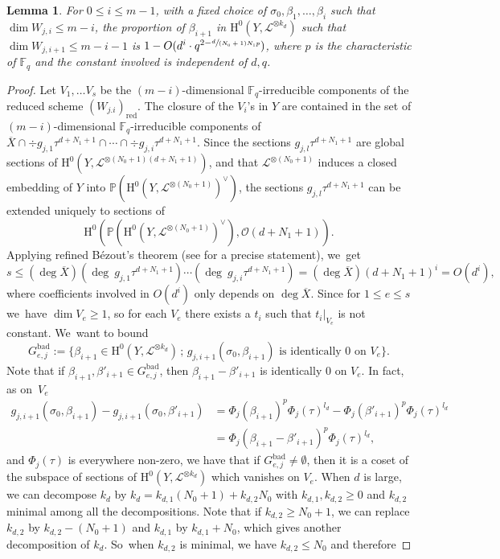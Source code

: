 \documentclass[JEP,XML,SOM,Unicode,published]{cedram}
\newcommand{\sep}{\,;\,}
\theoremstyle{plain}
\newtheorem{lem}[thm]{Lemma}
\theoremstyle{definition}
\newcommand{\ho}{\mathrm{H}}
\newcommand{\li}{\mathcal{L}}
\newcommand{\pr}{\mathbb{P}}
\newcommand{\F}{\mathbb{F}}
\begin{document}
\begin{lem}\label{reddim}
For $0\leq i\leq m-1$, with a fixed choice of $\sigma_0,\beta_1,\dots, \beta_i$ such that $\dim W_{j,i}\leq m-i$, the proportion of $\beta_{i+1}$ in $\ho^0(Y,\mathcal{L}^{\otimes k_d})$ such that $\dim W_{j,i+1} \leq m-i-1$ is $1-O(d^i\cdot q^{2-\sfrac{d}{(N_0+1)N_1p}})$, where $p$ is the characteristic of $\F_q$ and the constant involved is independent of $d,q$.
\end{lem}
\begin{proof}[Proof]
Let $V_1,\dots V_s$ be the $(m-i)$-dimensional $\F_q$-irreducible components of the reduced scheme $(W_{j.i})_{\mathrm{red}}$. The closure of the $V_i$'s in $Y$ are contained in the set of $(m-i)$-dimensional $\F_q$-irreducible components of $\overline{X}\cap \div g_{j,1}\tau^{d+N_1+1}\cap \cdots \cap \div g_{j,i}\tau^{d+N_1+1}$. Since the sections $g_{j,l}\tau^{d+N_1+1}$ are global sections of $\ho^0(Y, \li^{\otimes (N_0+1)(d+N_1+1)})$, and that $\li^{\otimes (N_0+1)}$ induces a closed embedding of $Y$ into $\pr(\ho^0(Y, \li^{\otimes (N_0+1)})^{\vee})$, the sections $g_{j,l}\tau^{d+N_1+1}$ can be extended uniquely to sections of
\[
\ho^0(\pr(\ho^0(Y, \li^{\otimes (N_0+1)})^{\vee}), \mathcal{O}(d+N_1+1)).
\]
Applying refined Bézout's theorem (see \cite[Th.\,12.3]{Fu84} for a precise statement), we~get
\[
s\leq (\deg \overline{X})(\deg \ g_{j,1}\tau^{d+N_1+1})\cdots (\deg \ g_{j,i}\tau^{d+N_1+1})=(\deg \overline{X})(d+N_1+1)^i=O(d^i),
\]
where coefficients involved in $O(d^i)$ only depends on $\deg \overline{X}$.
Since for $1\leq e\leq s$ we~have $\dim V_e\geq 1$, so for each $V_e$ there exists a $t_i$ such that $t_i|_{V_e}$ is not constant. We~want to bound
\[
G_{e,j}^{\mathrm{bad}}:=\bigl\{ \beta_{i+1}\in \ho^0(Y, \li^{\otimes k_d}) \sep g_{j, i+1}(\sigma_0, \beta_{i+1}) \text{ is identically }0 \text{ on }V_e \bigr\}.
\]
Note that if $\beta_{i+1},\beta'_{i+1}\!\in\! G_{e,j}^{\mathrm{bad}}$, then $\beta_{i+1}-\beta'_{i+1}$ is identically $0$ on $V_e$. In fact, as on~$V_e$
\begin{align*}
g_{j,i+1}(\sigma_0, \beta_{i+1})-g_{j,i+1}(\sigma_0, \beta'_{i+1})&= \Phi_j(\beta_{i+1})^p\Phi_j(\tau)^{l_d}-\Phi_j(\beta'_{i+1})^p\Phi_j(\tau)^{l_d} \\
&= \Phi_j(\beta_{i+1}-\beta'_{i+1})^p\Phi_j(\tau)^{l_d},
\end{align*}
and $\Phi_j(\tau)$ is everywhere non-zero, we have that if $G_{e,j}^{\mathrm{bad}}\not=\emptyset$, then it is a coset of the subspace of sections of $\ho^0(Y, \li^{\otimes k_d})$ which vanishes on $V_e$. When $d$ is large, we can decompose $k_d$ by $k_d=k_{d,1}(N_0+1)+k_{d,2}N_0$ with $k_{d,1},k_{d,2}\geq 0$ and $k_{d,2}$ minimal among all the decompositions. Note that if $k_{d,2}\geq N_0+1$, we can replace $k_{d,2}$ by $k_{d,2}-(N_0+1)$ and $k_{d,1}$ by $k_{d,1}+N_0$, which gives another decomposition of $k_d$. So~when $k_{d,2}$ is minimal, we have $k_{d,2}\leq N_0$ and therefore

\end{proof}
\end{document}
